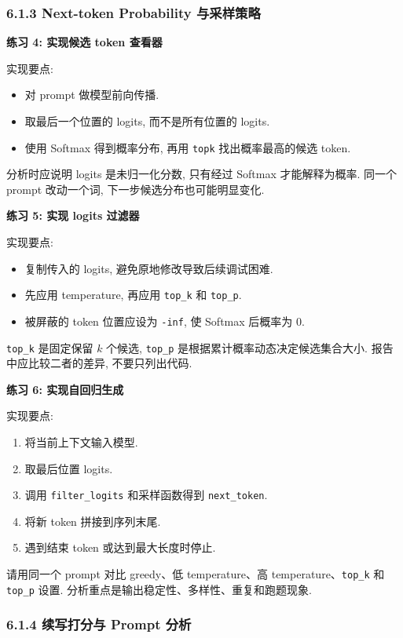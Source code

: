 \documentclass{../../nndlcourse}
\begin{document}
\subsubsection*{6.1.3 Next-token Probability 与采样策略}

\textbf{练习 4: 实现候选 token 查看器}

实现要点:
\begin{itemize}
    \item 对 prompt 做模型前向传播.
    \item 取最后一个位置的 logits, 而不是所有位置的 logits.
    \item 使用 Softmax 得到概率分布, 再用 \texttt{topk} 找出概率最高的候选 token.
\end{itemize}
分析时应说明 logits 是未归一化分数, 只有经过 Softmax 才能解释为概率. 同一个 prompt 改动一个词, 下一步候选分布也可能明显变化.

\textbf{练习 5: 实现 logits 过滤器}

实现要点:
\begin{itemize}
    \item 复制传入的 logits, 避免原地修改导致后续调试困难.
    \item 先应用 temperature, 再应用 \texttt{top\_k} 和 \texttt{top\_p}.
    \item 被屏蔽的 token 位置应设为 \texttt{-inf}, 使 Softmax 后概率为 0.
\end{itemize}
\texttt{top\_k} 是固定保留 $k$ 个候选, \texttt{top\_p} 是根据累计概率动态决定候选集合大小. 报告中应比较二者的差异, 不要只列出代码.

\textbf{练习 6: 实现自回归生成}

实现要点:
\begin{enumerate}
    \item 将当前上下文输入模型.
    \item 取最后位置 logits.
    \item 调用 \texttt{filter\_logits} 和采样函数得到 \texttt{next\_token}.
    \item 将新 token 拼接到序列末尾.
    \item 遇到结束 token 或达到最大长度时停止.
\end{enumerate}
请用同一个 prompt 对比 greedy、低 temperature、高 temperature、\texttt{top\_k} 和 \texttt{top\_p} 设置. 分析重点是输出稳定性、多样性、重复和跑题现象.

\subsubsection*{6.1.4 续写打分与 Prompt 分析}
\end{document}
